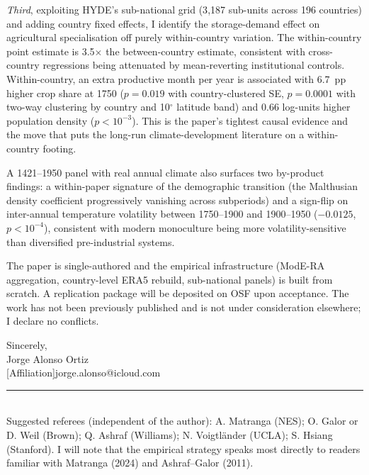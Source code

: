 \documentclass[11pt,letterpaper]{article}
\begin{document}
\emph{Third}, exploiting HYDE's sub-national grid (3{,}187 sub-units across 196 countries) and adding country fixed effects, I identify the storage-demand effect on agricultural specialisation off purely within-country variation. The within-country point estimate is 3.5$\times$ the between-country estimate, consistent with cross-country regressions being attenuated by mean-reverting institutional controls. Within-country, an extra productive month per year is associated with 6.7~pp higher crop share at 1750 ($p=0.019$ with country-clustered SE, $p=0.0001$ with two-way clustering by country and 10$^\circ$ latitude band) and 0.66 log-units higher population density ($p<10^{-3}$). This is the paper's tightest causal evidence and the move that puts the long-run climate-development literature on a within-country footing.

A 1421--1950 panel with real annual climate also surfaces two by-product findings: a within-paper signature of the demographic transition (the Malthusian density coefficient progressively vanishing across subperiods) and a sign-flip on inter-annual temperature volatility between 1750--1900 and 1900--1950 ($-0.0125$, $p < 10^{-4}$), consistent with modern monoculture being more volatility-sensitive than diversified pre-industrial systems.

The paper is single-authored and the empirical infrastructure (ModE-RA aggregation, country-level ERA5 rebuild, sub-national panels) is built from scratch. A replication package will be deposited on OSF upon acceptance. The work has not been previously published and is not under consideration elsewhere; I declare no conflicts.

\bigskip

\noindent Sincerely,\\[0.4em]
Jorge Alonso Ortiz\\[0.2em]
\small\textcolor{mutedgray}{[Affiliation]\quad\textbar\quad jorge.alonso@icloud.com}

\bigskip

\textcolor{mutedgray}{\rule{0.22\linewidth}{0.4pt}}\\[0.2em]
{\footnotesize\textcolor{mutedgray}{Suggested referees (independent of the author):}
A. Matranga (NES); O. Galor or D. Weil (Brown); Q. Ashraf (Williams); N. Voigtländer (UCLA); S. Hsiang (Stanford). I will note that the empirical strategy speaks most directly to readers familiar with Matranga (2024) and Ashraf--Galor (2011).}
\end{document}
